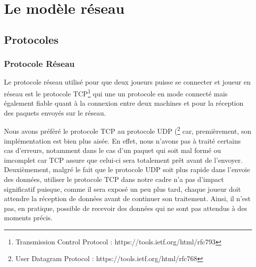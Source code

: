 \section{Le modèle réseau}

\subsection{Protocoles}
	\subsubsection{Protocole Réseau}
	Le protocole réseau utilisé pour que deux joueurs puisse se connecter et joueur en réseau est le protocole TCP\footnote{Transmission Control Protocol : https://tools.ietf.org/html/rfc793} qui une un protocole en mode connecté mais également fiable quant à la connexion entre deux machines et pour la réception des paquets envoyés sur le réseau. \newline
	
	Nous avons préféré le protocole TCP au protocole UDP (\footnote{User Datagram Protocol : https://tools.ietf.org/html/rfc768} car, premièrement, son implémentation est bien plus aisée. En effet, nous n'avons pas à traité certains cas d'erreurs, notamment dans le cas d'un paquet qui soit mal formé ou imcomplet car TCP assure que celui-ci sera totalement prêt avant de l'envoyer. \newline
	Deuxièmement, malgré le fait que le protocole UDP soit plus rapide dans l'envoie des données, utiliser le protocole TCP dans notre cadre n'a pas d'impact significatif puisque, comme il sera exposé un peu plus tard, chaque joueur doit attendre la réception de données avant de continuer son traitement. Ainsi, il n'est pas, en pratique, possible de recevoir des données qui ne sont pas attendus à des moments précis.

